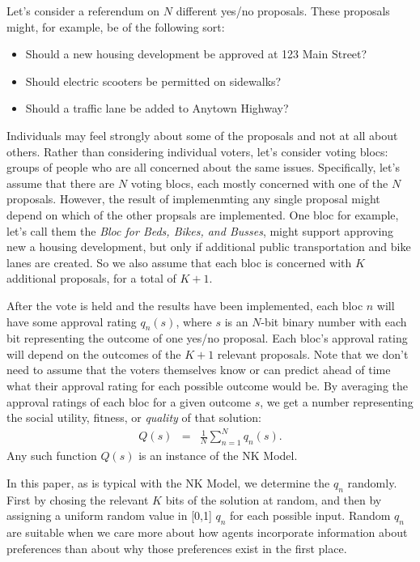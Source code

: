 \documentclass[manuscript,screen,review,acmsmall]{acmart}
\begin{document}
Let's consider a referendum on $N$ different yes/no proposals.
These proposals might, for example, be of the following sort:
\begin{itemize}
    \item{Should a new housing development be approved at 123 Main Street?}
    \item{Should electric scooters be permitted on sidewalks?}
    \item{Should a traffic lane be added to Anytown Highway?}
\end{itemize}

Individuals may feel strongly about some of the proposals and not at all about others.
Rather than considering individual voters, let's consider voting blocs:
groups of people who are all concerned about the same issues.
Specifically, let's assume that there are $N$ voting blocs, each mostly concerned with one of the $N$ proposals.
However, the result of implemenmting any single proposal might depend on which of the other propsals are implemented.
One bloc for example, let's call them the {\em Bloc for Beds, Bikes, and Busses}, might support approving new a housing development,
but only if additional public transportation and bike lanes are created.
So we also assume that each bloc is concerned with $K$ additional proposals, for a total of $K+1$.

After the vote is held and the results have been implemented, each bloc $n$ will have some approval rating $q_n(s)$,
where $s$ is an $N$-bit binary number with each bit representing the outcome of one yes/no proposal.
Each bloc's approval rating will depend on the outcomes of the $K+1$ relevant proposals.
Note that we don't need to assume that the voters themselves know or can predict ahead of time what their approval rating for each possible outcome would be.
By averaging the approval ratings of each bloc for a given outcome $s$, we get a number representing the social utility, fitness, or {\em quality} of that solution:
\begin{eqnarray}
    Q(s) &=& \frac{1}{N}\sum_{n=1}^N q_n(s).
\end{eqnarray}
Any such function $Q(s)$ is an instance of the NK Model.

In this paper, as is typical with the NK Model, we determine the $q_n$ randomly.
First by chosing the relevant $K$ bits of the solution at random, and then by assigning a uniform random value in [0,1] $q_n$ for each possible input.
Random $q_n$ are suitable when we care more about how agents incorporate information about preferences than about why those preferences exist in the first place.
\end{document}

